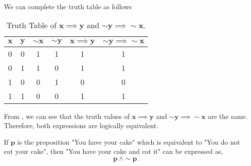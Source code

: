 \begin{subquestions}
\begin{subsubquestions}
\subsubquestion

We can complete the truth table as follows

\begin{table}[ht]
	\centering
	\begin{tabular}{|c|c|c|c|c|c|}
		\hline
		$\boldsymbol{x}$ & $\boldsymbol{y}$ & $\boldsymbol{\sim x}$ & $\boldsymbol{\sim y}$ & $\boldsymbol{x \implies y}$ & $\boldsymbol{\sim y \implies \sim x}$ \\
		\hline
		0 & 0 & 1 & 1 & 1 & 1 \\
		0 & 1 & 1 & 0 & 1 & 1 \\
		1 & 0 & 0 & 1 & 0 & 0 \\
		1 & 1 & 0 & 0 & 1 & 1 \\
		\hline
	\end{tabular}
	\caption{\label{2006:q1:tab:TruthTab1} Truth Table of $\boldsymbol{x \implies y}$ and $\boldsymbol{\sim y \implies \sim x}$.}
\end{table}

	
\subsubquestion

From , we can see that the truth values of $\boldsymbol{x \implies y}$ and $\boldsymbol{\sim y \implies \sim x}$ are the same. Therefore, both expressions are logically equivalent.

\end{subsubquestions}


\subquestion

\begin{subsubquestions}


\subsubquestion

If $\boldsymbol{p}$ is the proposition "You have your cake" which is equivalent to "You do not eat your cake", then "You have your cake and eat it" can be expressed as,
\begin{equation}
	\boldsymbol{p ~\land \sim p} \,.
\end{equation}



\end{subsubquestions}
\end{subquestions}
